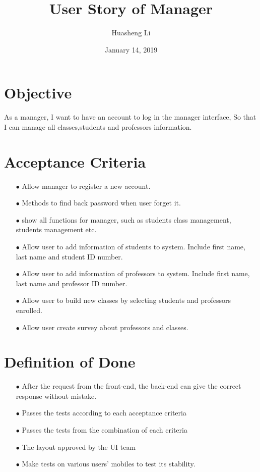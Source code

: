 \documentclass{article}
\begin{document}
\title{User Story of Manager}
\author{Huasheng Li}
\date{January 14, 2019}
\maketitle
\section*{Objective}
As a manager, I want to have an account to log in the manager interface, So that I can manage all classes,students and professors information.

\section*{Acceptance Criteria}
\begin{itemize}
\item[$\bullet$] Allow manager to register a new account.
\item[$\bullet$] Methods to find back password when user forget it.
\item[$\bullet$] show all functions for manager, such as students class management, students management etc.
\item[$\bullet$] Allow user to add information of students to system. Include first name, last name and student ID number.
\item[$\bullet$] Allow user to add information of professors to system. Include first name, last name and professor ID number.
\item[$\bullet$] Allow user to build new classes by selecting students and professors enrolled.
\item[$\bullet$] Allow user create survey about professors and classes.
\end{itemize}

\section*{Definition of Done}
\begin{itemize}
\item[$\bullet$] After the request from the front-end, the back-end can give the correct response without mistake.
\item[$\bullet$] Passes the tests according to each acceptance criteria
\item[$\bullet$] Passes the tests from the combination of each criteria
\item[$\bullet$] The layout approved by the UI team
\item[$\bullet$] Make tests on various users' mobiles to test its stability.
\end{itemize}
\end{document}
